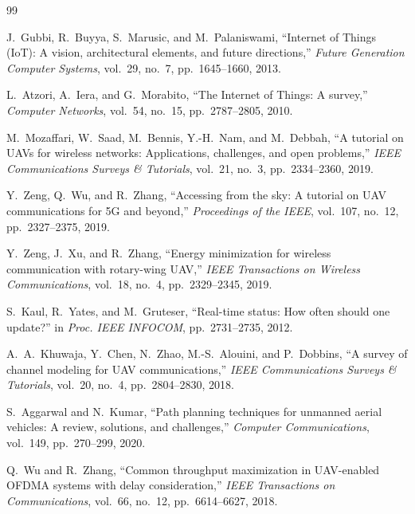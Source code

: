 \documentclass[12pt, a4paper, oneside]{report}
\begin{document}

\clearpage
{}
{}
\begin{thebibliography}{99}

J.~Gubbi, R.~Buyya, S.~Marusic, and M.~Palaniswami, ``Internet of Things (IoT): A vision, architectural elements, and future directions,'' \textit{Future Generation Computer Systems}, vol.~29, no.~7, pp.~1645--1660, 2013.

L.~Atzori, A.~Iera, and G.~Morabito, ``The Internet of Things: A survey,'' \textit{Computer Networks}, vol.~54, no.~15, pp.~2787--2805, 2010.

M.~Mozaffari, W.~Saad, M.~Bennis, Y.-H.~Nam, and M.~Debbah, ``A tutorial on UAVs for wireless networks: Applications, challenges, and open problems,'' \textit{IEEE Communications Surveys \& Tutorials}, vol.~21, no.~3, pp.~2334--2360, 2019.

Y.~Zeng, Q.~Wu, and R.~Zhang, ``Accessing from the sky: A tutorial on UAV communications for 5G and beyond,'' \textit{Proceedings of the IEEE}, vol.~107, no.~12, pp.~2327--2375, 2019.

Y.~Zeng, J.~Xu, and R.~Zhang, ``Energy minimization for wireless communication with rotary-wing UAV,'' \textit{IEEE Transactions on Wireless Communications}, vol.~18, no.~4, pp.~2329--2345, 2019.

S.~Kaul, R.~Yates, and M.~Gruteser, ``Real-time status: How often should one update?'' in \textit{Proc. IEEE INFOCOM}, pp.~2731--2735, 2012.

A.~A.~Khuwaja, Y.~Chen, N.~Zhao, M.-S.~Alouini, and P.~Dobbins, ``A survey of channel modeling for UAV communications,'' \textit{IEEE Communications Surveys \& Tutorials}, vol.~20, no.~4, pp.~2804--2830, 2018.

S.~Aggarwal and N.~Kumar, ``Path planning techniques for unmanned aerial vehicles: A review, solutions, and challenges,'' \textit{Computer Communications}, vol.~149, pp.~270--299, 2020.

Q.~Wu and R.~Zhang, ``Common throughput maximization in UAV-enabled OFDMA systems with delay consideration,'' \textit{IEEE Transactions on Communications}, vol.~66, no.~12, pp.~6614--6627, 2018.


\end{thebibliography}
\end{document}
